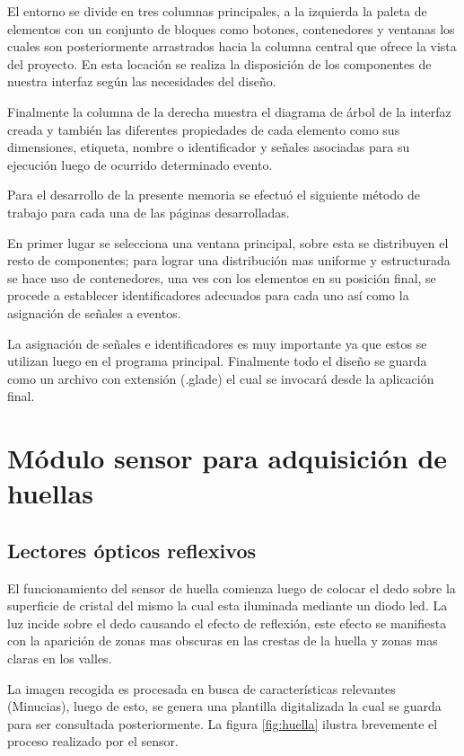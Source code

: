 El entorno se divide en tres columnas principales, a la izquierda la paleta de elementos con un conjunto de bloques como botones, contenedores y ventanas los cuales son posteriormente arrastrados hacia la columna central que ofrece la vista del proyecto. En esta locación se realiza la disposición de los componentes de nuestra interfaz según las necesidades del diseño.

Finalmente la columna de la derecha muestra el diagrama de árbol de la interfaz creada y también las diferentes propiedades de cada elemento como sus dimensiones, etiqueta, nombre o identificador y señales asociadas para su ejecución luego de ocurrido determinado evento.

Para el desarrollo de la presente memoria se efectuó el siguiente método de trabajo para cada una de las páginas desarrolladas. 

En primer lugar se selecciona una ventana principal, sobre esta se distribuyen el resto de componentes; para lograr una distribución mas uniforme y estructurada se hace uso de contenedores, una ves con los elementos en su posición final, se procede a establecer identificadores adecuados para cada uno así como la asignación de señales a eventos. 

La asignación de señales e identificadores es muy importante ya que estos se utilizan luego en el programa principal.
Finalmente todo el diseño se guarda como un archivo con extensión (.glade) el cual se invocará desde la aplicación final.

\section{Módulo sensor para adquisición de huellas}
\subsection{Lectores ópticos reflexivos}
El funcionamiento del sensor  de huella comienza luego de  colocar el dedo sobre la superficie de cristal del mismo la cual esta iluminada mediante un diodo led. La luz incide sobre el dedo causando el efecto de reflexión, este efecto se manifiesta con la aparición de zonas mas obscuras en las crestas de la huella y zonas mas claras en los valles.

La imagen recogida es procesada en busca de características relevantes (Minucias), luego de esto, se genera una plantilla digitalizada la cual se guarda para ser consultada posteriormente.
La figura \ref{fig:huella} ilustra brevemente el proceso realizado por el sensor.

